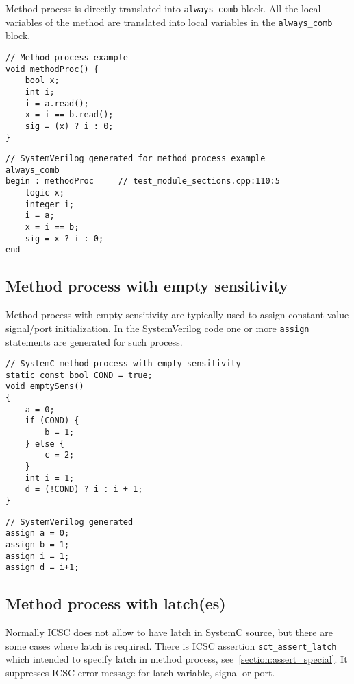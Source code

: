 Method process is directly translated into {\tt always\_comb} block. All the local variables of the method are translated into local variables in the {\tt always\_comb} block. 

\begin{lstlisting}[style=mycpp]
// Method process example
void methodProc() {
    bool x;
    int i;
    i = a.read();
    x = i == b.read();
    sig = (x) ? i : 0;
}
\end{lstlisting}

\begin{lstlisting}[style=myverilog]
// SystemVerilog generated for method process example
always_comb 
begin : methodProc     // test_module_sections.cpp:110:5
    logic x;
    integer i;
    i = a;
    x = i == b;
    sig = x ? i : 0;
end
\end{lstlisting}

\subsection{Method process with empty sensitivity}\label{section:empty_gen}

Method process with empty sensitivity are typically used to assign constant value signal/port initialization. In the SystemVerilog code one or more {\tt assign} statements are generated for such process. 

\begin{lstlisting}[style=mycpp]
// SystemC method process with empty sensitivity
static const bool COND = true;
void emptySens()
{
    a = 0;
    if (COND) {
        b = 1;
    } else {
        c = 2;
    }
    int i = 1;
    d = (!COND) ? i : i + 1; 
}
\end{lstlisting}
%
\begin{lstlisting}[style=myverilog]
// SystemVerilog generated
assign a = 0;
assign b = 1;
assign i = 1;
assign d = i+1;
\end{lstlisting}


\subsection{Method process with latch(es)}\label{section:method_latches}

Normally ICSC does not allow to have latch in SystemC source, but there are some cases where latch is required. There is ICSC assertion {\tt sct\_assert\_latch} which intended to specify latch in method process, see~\ref{section:assert_special}. It suppresses ICSC error message for latch variable, signal or port. 

